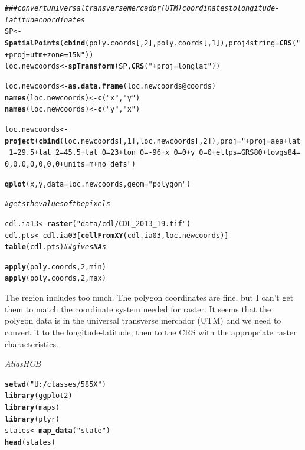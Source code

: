 \documentclass{article}\usepackage[]{graphicx}\usepackage[]{color}
\makeatletter
\newcommand{\hlnum}[1]{\textcolor[rgb]{0.686,0.059,0.569}{#1}}%
\newcommand{\hlstr}[1]{\textcolor[rgb]{0.192,0.494,0.8}{#1}}%
\newcommand{\hlcom}[1]{\textcolor[rgb]{0.678,0.584,0.686}{\textit{#1}}}%
\newcommand{\hlopt}[1]{\textcolor[rgb]{0,0,0}{#1}}%
\newcommand{\hlstd}[1]{\textcolor[rgb]{0.345,0.345,0.345}{#1}}%
\newcommand{\hlkwb}[1]{\textcolor[rgb]{0.69,0.353,0.396}{#1}}%
\newcommand{\hlkwc}[1]{\textcolor[rgb]{0.333,0.667,0.333}{#1}}%
\newcommand{\hlkwd}[1]{\textcolor[rgb]{0.737,0.353,0.396}{\textbf{#1}}}%
\newenvironment{kframe}{%
 \def\at@end@of@kframe{}%
 \ifinner\ifhmode%
  \def\at@end@of@kframe{\end{minipage}}%
  \begin{minipage}{\columnwidth}%
 \fi\fi%
 \def\FrameCommand##1{\hskip\@totalleftmargin \hskip-\fboxsep
 \colorbox{shadecolor}{##1}\hskip-\fboxsep
     \hskip-\linewidth \hskip-\@totalleftmargin \hskip\columnwidth}%
 \MakeFramed {\advance\hsize-\width
   \@totalleftmargin\z@ \linewidth\hsize
   \@setminipage}}%
 {\par\unskip\endMakeFramed%
 \at@end@of@kframe}
\newenvironment{knitrout}{}{} %
\makeatother
\begin{document}
\begin{itemize}
\begin{knitrout}
\begin{kframe}
\begin{alltt}
\hlcom{### convert universal transverse mercador (UTM) coordinates to longitude-latitude coordinates}
\hlstd{SP} \hlkwb{<-} \hlkwd{SpatialPoints}\hlstd{(}\hlkwd{cbind}\hlstd{(poly.coords[,} \hlnum{2}\hlstd{], poly.coords[,} \hlnum{1}\hlstd{]),} \hlkwc{proj4string} \hlstd{=} \hlkwd{CRS}\hlstd{(}\hlstr{"+proj=utm +zone=15N"}\hlstd{))}
\hlstd{loc.newcoords} \hlkwb{<-} \hlkwd{spTransform}\hlstd{(SP,} \hlkwd{CRS}\hlstd{(}\hlstr{"+proj=longlat"}\hlstd{))}

\hlstd{loc.newcoords} \hlkwb{<-} \hlkwd{as.data.frame}\hlstd{(loc.newcoords}\hlopt{@}\hlkwc{coords}\hlstd{)}
\hlkwd{names}\hlstd{(loc.newcoords)} \hlkwb{<-} \hlkwd{c}\hlstd{(}\hlstr{"x"}\hlstd{,} \hlstr{"y"}\hlstd{)}
\hlkwd{names}\hlstd{(loc.newcoords)} \hlkwb{<-} \hlkwd{c}\hlstd{(}\hlstr{"y"}\hlstd{,} \hlstr{"x"}\hlstd{)}

\hlstd{loc.newcoords} \hlkwb{<-} \hlkwd{project}\hlstd{(}\hlkwd{cbind}\hlstd{(loc.newcoords[,} \hlnum{1}\hlstd{], loc.newcoords[,} \hlnum{2}\hlstd{]),} \hlkwc{proj} \hlstd{=} \hlstr{"+proj=aea +lat_1=29.5 +lat_2=45.5 +lat_0=23 +lon_0=-96 +x_0=0 +y_0=0 +ellps=GRS80 +towgs84=0,0,0,0,0,0,0 +units=m +no_defs"}\hlstd{)}

\hlkwd{qplot}\hlstd{(x, y,} \hlkwc{data} \hlstd{= loc.newcoords,} \hlkwc{geom} \hlstd{=} \hlstr{"polygon"}\hlstd{)}

\hlcom{# gets the values of the pixels}

\hlstd{cdl.ia13} \hlkwb{<-} \hlkwd{raster}\hlstd{(}\hlstr{"data/cdl/CDL_2013_19.tif"}\hlstd{)}
\hlstd{cdl.pts} \hlkwb{<-} \hlstd{cdl.ia03[}\hlkwd{cellFromXY}\hlstd{(cdl.ia03, loc.newcoords)]}
\hlkwd{table}\hlstd{(cdl.pts)}  \hlcom{##gives NAs}

\hlkwd{apply}\hlstd{(poly.coords,} \hlnum{2}\hlstd{, min)}
\hlkwd{apply}\hlstd{(poly.coords,} \hlnum{2}\hlstd{, max)}
\end{alltt}
\end{kframe}
\end{knitrout}


The region includes too much. The polygon coordinates are fine, but I can't get them to match the coordinate system needed for raster. It seems that the polygon data is in the universal transverse mercador (UTM) and we need to convert it to the longitude-latitude, then to the CRS with the appropriate raster characteristics. 

\textit{AtlasHCB}\\

\begin{knitrout}
\color{fgcolor}\begin{kframe}
\begin{alltt}
\hlkwd{setwd}\hlstd{(}\hlstr{"U:/classes/585X"}\hlstd{)}
\hlkwd{library}\hlstd{(ggplot2)}
\hlkwd{library}\hlstd{(maps)}
\hlkwd{library}\hlstd{(plyr)}
\hlstd{states} \hlkwb{<-} \hlkwd{map_data}\hlstd{(}\hlstr{"state"}\hlstd{)}
\hlkwd{head}\hlstd{(states)}



\end{alltt}
\end{kframe}
\end{knitrout}
\end{itemize}
\end{document}
